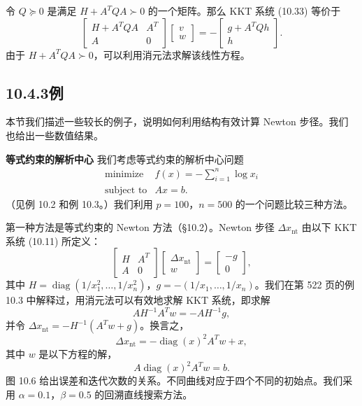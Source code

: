 \documentclass[UTF8,12pt,a4paper,fontset=fandol]{ctexart}
\begin{document}
令 $Q\succeq0$ 是满足 $H+A^TQA\succ0$ 的一个矩阵。那么 KKT 系统 (10.33) 等价于
\[
\begin{bmatrix}
H+A^TQA&A^T\\
A&0
\end{bmatrix}
\begin{bmatrix}
v\\
w
\end{bmatrix}
=-
\begin{bmatrix}
g+A^TQh\\
h
\end{bmatrix}.
\]
由于 $H+A^TQA\succ0$，可以利用消元法求解该线性方程。

\subsection*{10.4.3\quad 例}

本节我们描述一些较长的例子，说明如何利用结构有效计算 Newton 步径。我们也给出一些数值结果。

\noindent\textbf{等式约束的解析中心}\quad
我们考虑等式约束的解析中心问题
\[
\begin{array}{ll}
\mbox{minimize} & f(x)=-\displaystyle\sum_{i=1}^n\log x_i\\
\mbox{subject to} & Ax=b.
\end{array}
\]
（见例 10.2 和例 10.3。）我们利用 $p=100$，$n=500$ 的一个问题比较三种方法。

第一种方法是等式约束的 Newton 方法（\S10.2）。Newton 步径 $\Delta x_{\mathrm{nt}}$ 由以下 KKT 系统 (10.11) 所定义：
\[
\begin{bmatrix}
H&A^T\\
A&0
\end{bmatrix}
\begin{bmatrix}
\Delta x_{\mathrm{nt}}\\
w
\end{bmatrix}
=
\begin{bmatrix}
-g\\
0
\end{bmatrix},
\]
其中 $H=\operatorname{diag}(1/x_1^2,\ldots,1/x_n^2)$，$g=-(1/x_1,\ldots,1/x_n)$。我们在第 522 页的例 10.3 中解释过，用消元法可以有效地求解 KKT 系统，即求解
\[
AH^{-1}A^Tw=-AH^{-1}g,
\]
并令 $\Delta x_{\mathrm{nt}}=-H^{-1}(A^Tw+g)$。换言之，
\[
\Delta x_{\mathrm{nt}}=-\operatorname{diag}(x)^2A^Tw+x,
\]
其中 $w$ 是以下方程的解，
\begin{equation}
A\operatorname{diag}(x)^2A^Tw=b.
\tag{10.34}
\end{equation}
图 10.6 给出误差和迭代次数的关系。不同曲线对应于四个不同的初始点。我们采用 $\alpha=0.1$，$\beta=0.5$ 的回溯直线搜索方法。
\end{document}
